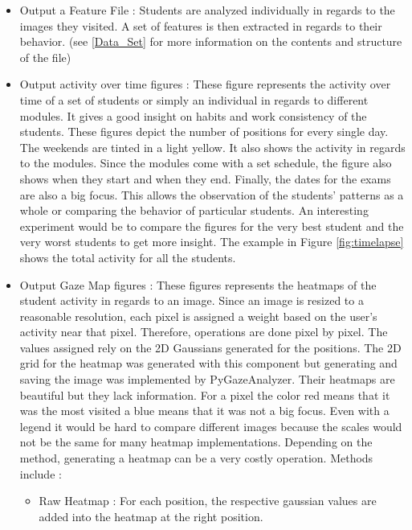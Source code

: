 \documentclass[a4paper,11pt]{report}
\numberwithin{figure}{section} %
\begin{document}
    \begin{itemize}
        \item[\textbullet] Output a Feature File : Students are analyzed individually in regards to the images they visited.
        A set of features is then extracted in regards to their behavior.
        (see \ref{Data_Set} for more information on the contents and structure of the file)
        \item[\textbullet] Output activity over time figures : These figure represents the activity over time of a set of students or simply an individual in regards to different modules.
        It gives a good insight on habits and work consistency of the students.
        These figures depict the number of positions for every single day.
        The weekends are tinted in a light yellow.
        It also shows the activity in regards to the modules.
        Since the modules come with a set schedule, the figure also shows when they start and when they end.
        Finally, the dates for the exams are also a big focus.
        This allows the observation of the students' patterns as a whole or comparing the behavior of particular students.
        An interesting experiment would be to compare the figures for the very best student and the very worst students to get more insight.
        The example in Figure \ref{fig:timelapse} shows the total activity for all the students.
        \item[\textbullet] Output Gaze Map figures : These figures represents the heatmaps of the student activity in regards to an image.
        Since an image is resized to a reasonable resolution, each pixel is assigned a weight based on the user's activity near that pixel.
        Therefore, operations are done pixel by pixel.
        The values assigned rely on the 2D Gaussians generated for the positions.
        The 2D grid for the heatmap was generated with this component but generating and saving the image was implemented by PyGazeAnalyzer.
        Their heatmaps are beautiful but they lack information. For a pixel the color red means that it was the most visited a blue means that it was not a big focus.
        Even with a legend it would be hard to compare different images because the scales would not be the same for many heatmap implementations.
        Depending on the method, generating a heatmap can be a very costly operation.
        Methods include :
        \begin{itemize}
            \item Raw Heatmap : For each position, the respective gaussian values are added into the heatmap at the right position.

\end{itemize}
\end{itemize}
\end{document}
